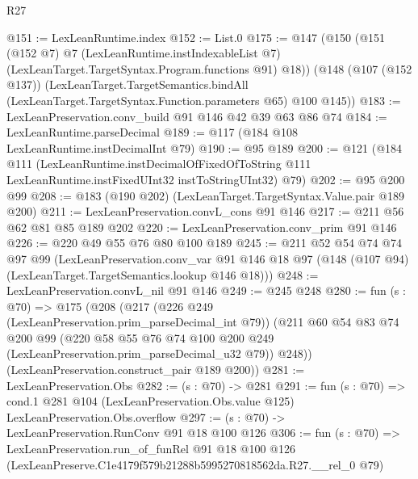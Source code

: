 \begin{lexlean}{R27}
\begin{coremodule}
@151 := LexLeanRuntime.index
@152 := List.{0}
@175 := @147
    (@150
      (@151
        (@152 @7)
        @7
        (LexLeanRuntime.instIndexableList @7)
        (LexLeanTarget.TargetSyntax.Program.functions @91)
        @18))
    (@148
      (@107 (@152 @137))
      (LexLeanTarget.TargetSemantics.bindAll
        (LexLeanTarget.TargetSyntax.Function.parameters @65)
        @100
        @145))
@183 := LexLeanPreservation.conv_build @91 @146 @42 @39 @63 @86 @74
@184 := LexLeanRuntime.parseDecimal
@189 := @117 (@184 @108 LexLeanRuntime.instDecimalInt @79)
@190 := @95 @189
@200 := @121
    (@184
      @111
      (LexLeanRuntime.instDecimalOfFixedOfToString
        @111
        LexLeanRuntime.instFixedUInt32
        instToStringUInt32)
      @79)
@202 := @95 @200 @99
@208 := @183 (@190 @202) (LexLeanTarget.TargetSyntax.Value.pair @189 @200)
@211 := LexLeanPreservation.convL_cons @91 @146
@217 := @211 @56 @62 @81 @85 @189 @202
@220 := LexLeanPreservation.conv_prim @91 @146
@226 := @220 @49 @55 @76 @80 @100 @189
@245 := @211
    @52
    @54
    @74
    @74
    @97
    @99
    (LexLeanPreservation.conv_var
      @91
      @146
      @18
      @97
      (@148 (@107 @94) (LexLeanTarget.TargetSemantics.lookup @146 @18)))
@248 := LexLeanPreservation.convL_nil @91 @146
@249 := @245 @248
@280 := fun (s : @70) =>
  @175
    (@208
      (@217
        (@226 @249 (LexLeanPreservation.prim_parseDecimal_int @79))
        (@211
          @60
          @54
          @83
          @74
          @200
          @99
          (@220 @58 @55 @76 @74 @100 @200 @249 (LexLeanPreservation.prim_parseDecimal_u32 @79))
          @248))
      (LexLeanPreservation.construct_pair @189 @200))
@281 := LexLeanPreservation.Obs
@282 := (s : @70) -> @281
@291 := fun (s : @70) =>
  cond.{1} @281 @104 (LexLeanPreservation.Obs.value @125) LexLeanPreservation.Obs.overflow
@297 := (s : @70) -> LexLeanPreservation.RunConv @91 @18 @100 @126
@306 := fun (s : @70) =>
  LexLeanPreservation.run_of_funRel
    @91
    @18
    @100
    @126
    (LexLeanPreserve.C1e4179f579b21288b5995270818562da.R27.__rel_0 @79)
\end{coremodule}
\end{lexlean}
